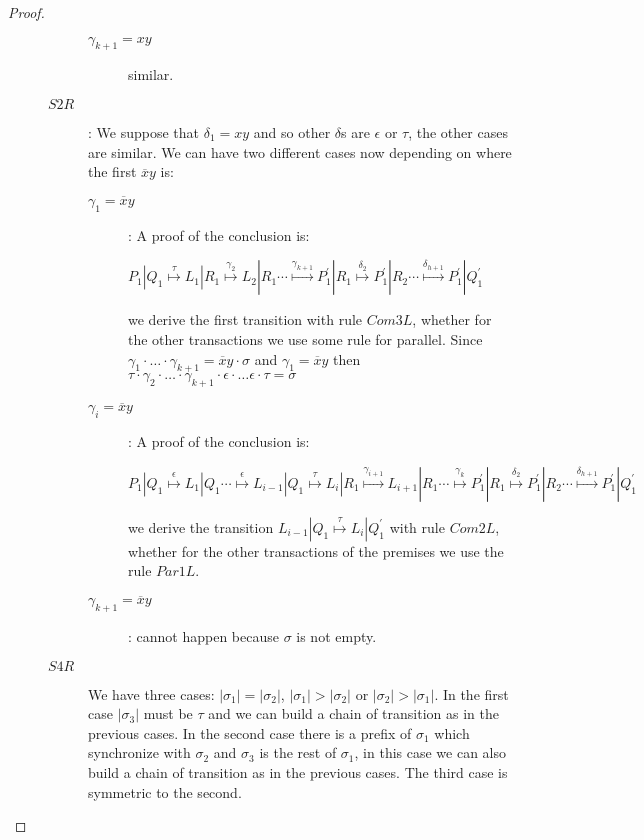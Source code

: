 \begin{proposition}
\begin{proof}
\begin{description}
\begin{description}
\begin{description}
	      \item[$\gamma_{k+1}=xy$] similar.
	    \end{description}
	  \item[$S2R$]: 
	    We suppose that $\delta_{1}=xy$ and so other $\delta$s are $\epsilon$ or $\tau$, the other cases are similar. We can have two different cases now depending on where the first $\overline{x}y$ is:
	      \begin{description}
		\item[$\gamma_{1}=\overline{x}y$]:
		  A proof of the conclusion is:
		  \begin{center}
		    $P_{1}|Q_{1} \stackrel{\tau}{\longmapsto} L_{1}|R_{1}
 			      \stackrel{\gamma_{2}}{\longmapsto} L_{2}|R_{1}
			\cdots
 			      \stackrel{\gamma_{k+1}}{\longmapsto} P_{1}^{'}|R_{1}
			      \stackrel{\delta_{2}}{\longmapsto} P_{1}^{'}|R_{2}
			\cdots
			      \stackrel{\delta_{h+1}}{\longmapsto} P_{1}^{'}|Q_{1}^{'}$
		  \end{center}
		  we derive the first transition with rule $Com3L$, whether for the other transactions we use some rule for parallel. Since $\gamma_{1} \cdot \ldots \cdot \gamma_{k+1} = \overline{x}y \cdot \sigma$ and $\gamma_{1}=\overline{x}y$ then $\tau \cdot \gamma_{2}\cdot \ldots \cdot \gamma_{k+1}\cdot \epsilon \cdot \ldots \epsilon \cdot \tau=\sigma$
		\item[$\gamma_{i}=\overline{x}y$]:
		  A proof of the conclusion is:
		  \begin{center}
		    $P_{1}|Q_{1} \stackrel{\epsilon}{\longmapsto} L_{1}|Q_{1} 
			\cdots
 			      \stackrel{\epsilon}{\longmapsto} L_{i-1}|Q_{1} 
 			      \stackrel{\tau}{\longmapsto} L_{i}|R_{1}
 			      \stackrel{\gamma_{i+1}}{\longmapsto} L_{i+1}|R_{1}
			\cdots 
 			      \stackrel{\gamma_{k}}{\longmapsto} P_{1}^{'}|R_{1}
 			      \stackrel{\delta_{2}}{\longmapsto} P_{1}^{'}|R_{2}
			\cdots 
 			      \stackrel{\delta_{h+1}}{\longmapsto} P_{1}^{'}|Q_{1}^{'}$	  
		  \end{center}
		  we derive the transition $L_{i-1}|Q_{1} \stackrel{\tau}{\longmapsto} L_{i}|Q_{1}^{'}$ with rule $Com2L$, whether for the other transactions of the premises we use the rule $Par1L$.
		\item[$\gamma_{k+1}=\overline{x}y$]: cannot happen because $\sigma$ is not empty.
	      \end{description}
	    \item[$S4R$]
	      We have three cases: $|\sigma_{1}|=|\sigma_{2}|$, $|\sigma_{1}|>|\sigma_{2}|$ or $|\sigma_{2}|>|\sigma_{1}|$. In the first case $|\sigma_{3}|$ must be $\tau$ and we can build a chain of transition as in the previous cases. In the second case there is a prefix of $\sigma_{1}$ which synchronize with $\sigma_{2}$ and $\sigma_{3}$ is the rest of $\sigma_{1}$, in this case we can also build a chain of transition as in the previous cases. The third case is symmetric to the second.
	  \end{description}
    \end{description}
  \end{proof}
\end{proposition}


